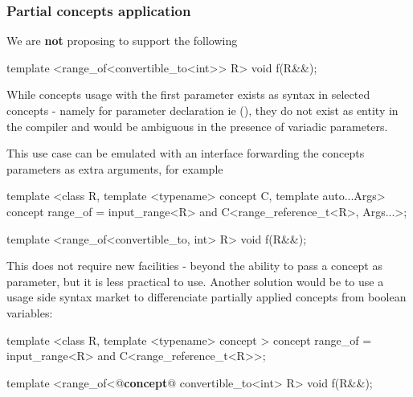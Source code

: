 \documentclass{wg21}
\begin{document}
%

\subsubsection{Partial concepts application}

We are \textbf{not} proposing to support the following

\begin{colorblock}
template <range_of<convertible_to<int>> R> void f(R&&);
\end{colorblock}

While concepts usage with the first parameter exists as syntax in selected concepts - namely for parameter declaration ie (),
they do not exist as entity in the compiler and would be ambiguous in the presence of variadic parameters.

This use case can be emulated with an interface forwarding the concepts parameters as extra arguments, for example

\begin{colorblock}
template <class R, template <typename> concept C, template auto...Args>
concept range_of = input_range<R> and C<range_reference_t<R>, Args...>;

template <range_of<convertible_to, int> R> void f(R&&);
\end{colorblock}

This does not require new facilities - beyond the ability to pass a concept as parameter, but it is less practical to use.
Another solution would be to use a usage side syntax market to differenciate partially applied concepts from boolean variables:

\begin{colorblock}
template <class R, template <typename> concept >
concept range_of = input_range<R> and C<range_reference_t<R>>;

template <range_of<@\textbf{concept}@ convertible_to<int> R>
void f(R&&);
\end{colorblock}
\end{document}
